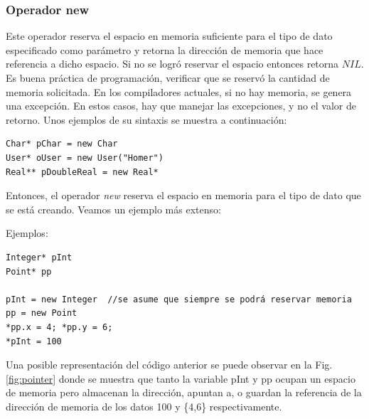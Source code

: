 \subsubsection{Operador new}

Este operador reserva el espacio en memoria suficiente para el tipo de dato especificado como parámetro y retorna la dirección de memoria que hace referencia a dicho espacio. Si no se logró reservar el espacio entonces retorna $NIL$. Es buena práctica de programación, verificar que se reservó la cantidad de memoria solicitada. En los compiladores actuales, si no hay memoria, se genera una excepción. En estos casos, hay que manejar las excepciones, y no el valor de retorno. Unos ejemplos de su sintaxis se muestra a continuación:
\begin{lstlisting}[upquote=true, language=pseudo]
Char* pChar = new Char
User* oUser = new User("Homer")
Real** pDoubleReal = new Real*
\end{lstlisting}

Entonces, el operador \textit{new} reserva el espacio en memoria para el tipo de dato que se está creando. Veamos un ejemplo más extenso:

Ejemplos:
\begin{lstlisting}[upquote=true, language=pseudo]
Integer* pInt
Point* pp

pInt = new Integer	//se asume que siempre se podrá reservar memoria
pp = new Point
*pp.x = 4; *pp.y = 6;
*pInt = 100
\end{lstlisting}

Una posible representación del código anterior se puede observar en la Fig. \ref{fig:pointer} donde se muestra que tanto la variable pInt y pp ocupan un espacio de memoria pero almacenan la dirección, apuntan a, o guardan la referencia de la dirección de memoria de los datos 100 y \{4,6\} respectivamente.

